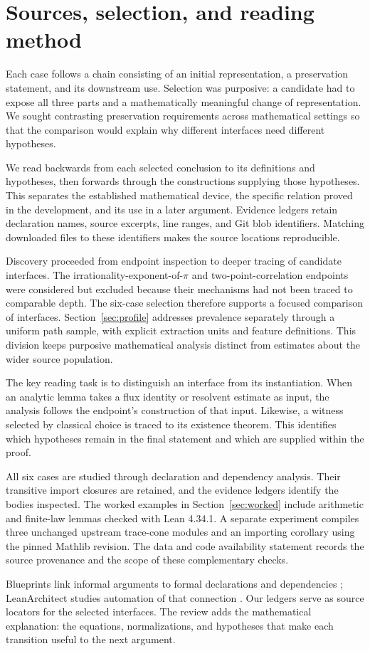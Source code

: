 \section{Sources, selection, and reading method}
\label{sec:method}

Each case follows a chain consisting of an initial representation, a
preservation statement, and its downstream use. Selection was purposive:
a candidate had to expose all three parts and a mathematically meaningful
change of representation. We sought contrasting preservation requirements
across mathematical settings so that the comparison would explain why
different interfaces need different hypotheses.

We read backwards from each selected conclusion to its definitions and
hypotheses, then forwards through the constructions supplying those
hypotheses. This separates the established mathematical device, the
specific relation proved in the development, and its use in a later
argument. Evidence ledgers retain declaration names, source excerpts,
line ranges, and Git blob identifiers. Matching downloaded files to these
identifiers makes the source locations reproducible.

Discovery proceeded from endpoint inspection to deeper tracing of
candidate interfaces. The irrationality-exponent-of-$\pi$ and
two-point-correlation endpoints were considered but excluded because
their mechanisms had not been traced to comparable depth. The six-case
selection therefore supports a focused comparison of interfaces.
Section~\ref{sec:profile} addresses prevalence separately through a
uniform path sample, with explicit extraction units and feature
definitions. This division keeps purposive mathematical analysis distinct
from estimates about the wider source population.

The key reading task is to distinguish an interface from its
instantiation. When an analytic lemma takes a flux identity or resolvent
estimate as input, the analysis follows the endpoint's construction of
that input. Likewise, a witness selected by classical choice is traced
to its existence theorem. This identifies which hypotheses remain in
the final statement and which are supplied within the proof.

All six cases are studied through declaration and dependency analysis.
Their transitive  import closures are retained, and the evidence
ledgers identify the bodies inspected. The worked examples in
Section~\ref{sec:worked} include arithmetic and finite-law lemmas checked
with Lean 4.34.1. A separate experiment compiles three unchanged upstream
trace-cone modules and an importing corollary using the pinned Mathlib
revision. The data and code availability statement records the source
provenance and the scope of these complementary checks.

Blueprints link informal arguments to formal declarations and
dependencies \citep{MassotLeanBlueprint}; LeanArchitect studies
automation of that connection \citep{ZhuEtAl2026}. Our ledgers serve as
source locators for the selected interfaces. The review adds the
mathematical explanation: the equations, normalizations, and hypotheses
that make each transition useful to the next argument.
